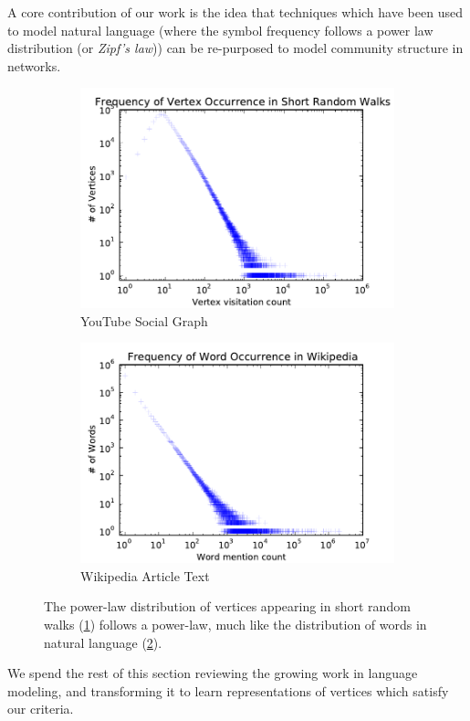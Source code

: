 \documentclass{sig-alternate}
\begin{document}
A core contribution of our work is the idea that techniques which have been used to model natural language (where the symbol frequency follows a power law distribution (or \emph{Zipf's law})) can be re-purposed to model community structure in networks.
\begin{figure}
	\centering
      \begin{subfigure}[b]{0.48\columnwidth}
                \includegraphics[width=\columnwidth]{figures/powerlaw/youtube-powerlaw}
		\caption{YouTube Social Graph}
		\label{fig:powerlaw-youtube}
	\end{subfigure}
      \begin{subfigure}[b]{0.48\columnwidth}
                \includegraphics[width=\columnwidth]{figures/powerlaw/wiki-powerlaw}	
		\caption{Wikipedia Article Text}
		\label{fig:powerlaw-wiki}
	\end{subfigure}
\caption{The power-law distribution of vertices appearing in short random walks (\ref{fig:powerlaw-youtube}) follows a power-law, much like the distribution of words in natural language (\ref{fig:powerlaw-wiki}).  
}
\label{fig:power_law}
\end{figure}
We spend the rest of this section reviewing the growing work in language modeling, and transforming it to learn representations of vertices which satisfy our criteria.
\end{document}
